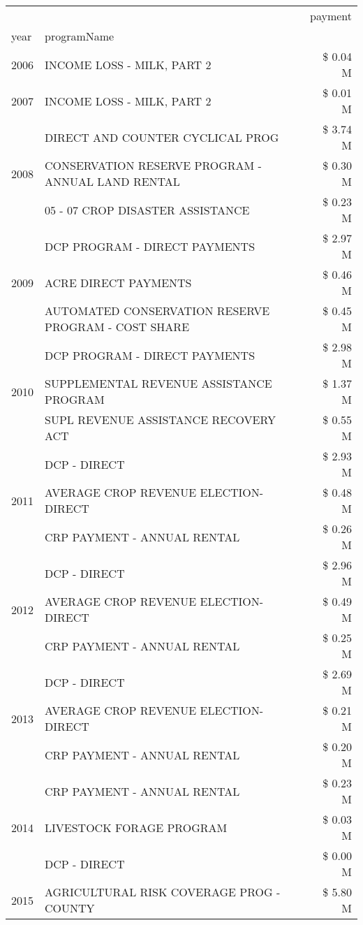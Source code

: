 \begin{tabular}{llr}
\toprule
 &  & payment \\
year & programName &  \\
\midrule
2006 & INCOME LOSS - MILK, PART 2 & \$ 0.04 M \\
\cline{1-3}
2007 & INCOME LOSS - MILK, PART 2 & \$ 0.01 M \\
\cline{1-3}
\multirow[t]{3}{*}{2008} & DIRECT AND COUNTER CYCLICAL PROG & \$ 3.74 M \\
 & CONSERVATION RESERVE PROGRAM - ANNUAL LAND RENTAL & \$ 0.30 M \\
 & 05 - 07 CROP DISASTER ASSISTANCE & \$ 0.23 M \\
\cline{1-3}
\multirow[t]{3}{*}{2009} & DCP PROGRAM - DIRECT PAYMENTS & \$ 2.97 M \\
 & ACRE DIRECT PAYMENTS & \$ 0.46 M \\
 & AUTOMATED CONSERVATION RESERVE PROGRAM - COST SHARE & \$ 0.45 M \\
\cline{1-3}
\multirow[t]{3}{*}{2010} & DCP PROGRAM - DIRECT PAYMENTS & \$ 2.98 M \\
 & SUPPLEMENTAL REVENUE ASSISTANCE PROGRAM & \$ 1.37 M \\
 & SUPL REVENUE ASSISTANCE RECOVERY ACT & \$ 0.55 M \\
\cline{1-3}
\multirow[t]{3}{*}{2011} & DCP - DIRECT & \$ 2.93 M \\
 & AVERAGE CROP REVENUE ELECTION-DIRECT & \$ 0.48 M \\
 & CRP PAYMENT - ANNUAL RENTAL & \$ 0.26 M \\
\cline{1-3}
\multirow[t]{3}{*}{2012} & DCP - DIRECT & \$ 2.96 M \\
 & AVERAGE CROP REVENUE ELECTION-DIRECT & \$ 0.49 M \\
 & CRP PAYMENT - ANNUAL RENTAL & \$ 0.25 M \\
\cline{1-3}
\multirow[t]{3}{*}{2013} & DCP - DIRECT & \$ 2.69 M \\
 & AVERAGE CROP REVENUE ELECTION-DIRECT & \$ 0.21 M \\
 & CRP PAYMENT - ANNUAL RENTAL & \$ 0.20 M \\
\cline{1-3}
\multirow[t]{3}{*}{2014} & CRP PAYMENT - ANNUAL RENTAL & \$ 0.23 M \\
 & LIVESTOCK FORAGE PROGRAM & \$ 0.03 M \\
 & DCP - DIRECT & \$ 0.00 M \\
\cline{1-3}
\multirow[t]{3}{*}{2015} & AGRICULTURAL RISK COVERAGE PROG - COUNTY & \$ 5.80 M \\

\end{tabular}

